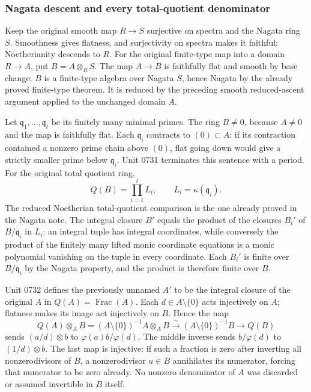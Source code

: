 \subsubsection{Nagata descent and every total-quotient denominator}\label{nagata-descent-and-every-total-quotient-denominator}

Keep the original smooth map \(R\to S\) surjective on spectra and the Nagata ring \(S\). Smoothness gives flatness, and surjectivity on spectra makes it faithful; Noetherianity descends to \(R\). For the original finite-type map into a domain \(R\to A\), put \(B=A\otimes_RS\). The map \(A\to B\) is faithfully flat and smooth by base change; \(B\) is a finite-type algebra over Nagata \(S\), hence Nagata by the already proved finite-type theorem. It is reduced by the preceding smooth reduced-ascent argument applied to the unchanged domain \(A\).

Let \(\mathfrak q_1,\ldots,\mathfrak q_t\) be its finitely many minimal primes. The ring \(B\ne0\), because \(A\ne0\) and the map is faithfully flat. Each \(\mathfrak q_i\) contracts to \((0)\subset A\): if its contraction contained a nonzero prime chain above \((0)\), flat going down would give a strictly smaller prime below \(\mathfrak q_i\). Unit 0731 terminates this sentence with a period. For the original total quotient ring, \[
 Q(B)=\prod_{i=1}^t L_i,\qquad L_i=\kappa(\mathfrak q_i).
\] The reduced Noetherian total-quotient comparison is the one already proved in the Nagata note. The integral closure \(B'\) equals the product of the closures \(B_i'\) of \(B/\mathfrak q_i\) in \(L_i\): an integral tuple has integral coordinates, while conversely the product of the finitely many lifted monic coordinate equations is a monic polynomial vanishing on the tuple in every coordinate. Each \(B_i'\) is finite over \(B/\mathfrak q_i\) by the Nagata property, and the product is therefore finite over \(B\).

Unit 0732 defines the previously unnamed \(A'\) to be the integral closure of the original \(A\) in \(Q(A)=\operatorname{Frac}(A)\). Each \(d\in A\setminus\{0\}\) acts injectively on \(A\); flatness makes its image act injectively on \(B\). Hence the map \[
 Q(A)\otimes_AB
 =(A\setminus\{0\})^{-1}A\otimes_AB
 \xrightarrow{\sim}(A\setminus\{0\})^{-1}B
 \longrightarrow Q(B)
\] sends \((a/d)\otimes b\) to \(\varphi(a)b/\varphi(d)\). The middle inverse sends \(b/\varphi(d)\) to \((1/d)\otimes b\). The last map is injective: if such a fraction is zero after inverting all nonzerodivisors of \(B\), a nonzerodivisor \(u\in B\) annihilates its numerator, forcing that numerator to be zero already. No nonzero denominator of \(A\) was discarded or assumed invertible in \(B\) itself.

